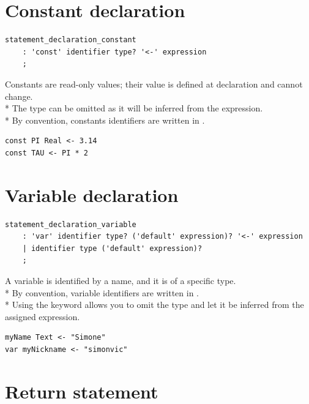 
\section{Constant declaration}

\begin{verbatim}
statement_declaration_constant
	: 'const' identifier type? '<-' expression
	;
\end{verbatim}

Constants are read-only values; their value is defined at declaration and
cannot change.\\*
The type can be omitted as it will be inferred from the expression.\\*
By convention, constants identifiers are written in .


\begin{verbatim}
const PI Real <- 3.14
const TAU <- PI * 2
\end{verbatim}

\section{Variable declaration}

\begin{verbatim}
statement_declaration_variable
	: 'var' identifier type? ('default' expression)? '<-' expression
	| identifier type ('default' expression)?
	;
\end{verbatim}

A variable is identified by a name, and it is of a specific type.\\*
By convention, variable identifiers are written in .\\*
Using the  keyword allows you to omit the type and let it be inferred
from the assigned expression.

\begin{verbatim}
myName Text <- "Simone"
var myNickname <- "simonvic"
\end{verbatim}

\section{Return statement}

